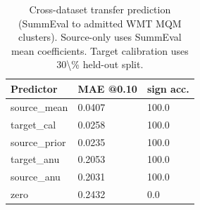 \begin{table}[t]
\centering
\small
\begin{tabular}{lll}
\toprule
Predictor & MAE @0.10 & sign acc. \\
\midrule
source\_mean & 0.0407 & 100.0 \\
target\_cal & 0.0258 & 100.0 \\
source\_prior & 0.0235 & 100.0 \\
target\_anu & 0.2053 & 100.0 \\
source\_anu & 0.2031 & 100.0 \\
zero & 0.2432 & 0.0 \\
\bottomrule
\end{tabular}
\vspace{0.25em}
\caption{Cross-dataset transfer prediction (SummEval to admitted WMT MQM clusters). Source-only uses SummEval mean coefficients. Target calibration uses 30\textbackslash{}\% held-out split.}
\label{tab:ood-transfer}
\end{table}

